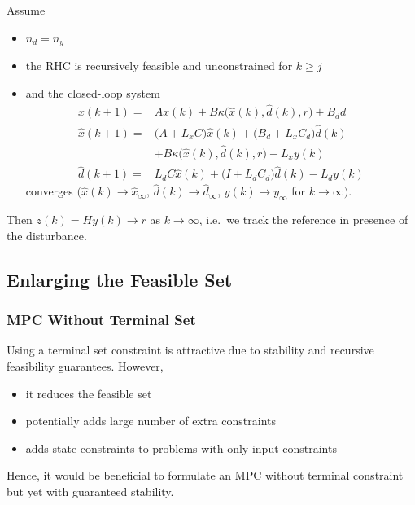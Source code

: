 Assume
\begin{itemize}
    \item $n_d = n_y$
    \item the RHC is recursively feasible and unconstrained for $k \geq j$
    \item and the closed-loop system
          \begin{align*}
              x(k+1)        =     & Ax(k) + B \kappa\bigl(\widehat{x}(k), \widehat{d}(k), r\bigr) + B_d d           \\
              \widehat{x}(k+1)  = & \bigl(A + L_x C\bigr) \widehat{x}(k) + \bigl(B_d + L_x C_d\bigr) \widehat{d}(k) \\
                                  & + B \kappa\bigl(\widehat{x}(k), \widehat{d}(k), r\bigr) - L_x y(k)              \\
              \widehat{d}(k+1)  = & L_d C \widehat{x}(k) + \bigl(I + L_d C_d\bigr) \widehat{d}(k) - L_d y(k)
          \end{align*}
          converges $\bigl(\widehat{x}(k)\rightarrow \widehat{x}_{\infty}$, $\widehat{d}(k)\rightarrow \widehat{d}_{\infty}$, $y(k)\rightarrow y_{\infty}$ for $k\rightarrow \infty\bigr)$.
\end{itemize}
Then $z(k) = Hy(k) \to r$ as $k \to \infty$, i.e.\ we track the reference in presence of the disturbance.

\subsection{Enlarging the Feasible Set}
\subsubsection{MPC Without Terminal Set}
Using a terminal set constraint is attractive due to stability and recursive feasibility guarantees. However,
\begin{itemize}
    \item it reduces the feasible set
    \item potentially adds large number of extra constraints
    \item adds state constraints to problems with only input constraints
\end{itemize}
Hence, it would be beneficial to formulate an MPC without terminal constraint but yet with guaranteed stability.
\newpar{}

